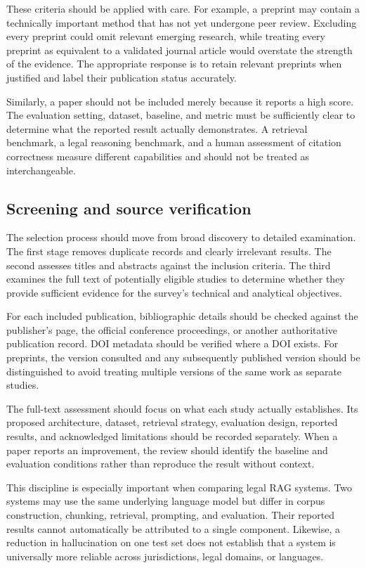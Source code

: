 These criteria should be applied with care. For example, a preprint may contain a technically
important method that has not yet undergone peer review. Excluding every preprint could omit
relevant emerging research, while treating every preprint as equivalent to a validated journal
article would overstate the strength of the evidence. The appropriate response is to retain
relevant preprints when justified and label their publication status accurately.

Similarly, a paper should not be included merely because it reports a high score. The evaluation
setting, dataset, baseline, and metric must be sufficiently clear to determine what the reported
result actually demonstrates. A retrieval benchmark, a legal reasoning benchmark, and a human
assessment of citation correctness measure different capabilities and should not be treated as
interchangeable.

\subsection{Screening and source verification}

The selection process should move from broad discovery to detailed examination. The first stage
removes duplicate records and clearly irrelevant results. The second assesses titles and abstracts
against the inclusion criteria. The third examines the full text of potentially eligible studies to
determine whether they provide sufficient evidence for the survey's technical and analytical
objectives.

For each included publication, bibliographic details should be checked against the publisher's
page, the official conference proceedings, or another authoritative publication record. DOI
metadata should be verified where a DOI exists. For preprints, the version consulted and any
subsequently published version should be distinguished to avoid treating multiple versions of the
same work as separate studies.

The full-text assessment should focus on what each study actually establishes. Its proposed
architecture, dataset, retrieval strategy, evaluation design, reported results, and acknowledged
limitations should be recorded separately. When a paper reports an improvement, the review should
identify the baseline and evaluation conditions rather than reproduce the result without context.

This discipline is especially important when comparing legal RAG systems. Two systems may use the
same underlying language model but differ in corpus construction, chunking, retrieval, prompting,
and evaluation. Their reported results cannot automatically be attributed to a single component.
Likewise, a reduction in hallucination on one test set does not establish that a system is
universally more reliable across jurisdictions, legal domains, or languages.

